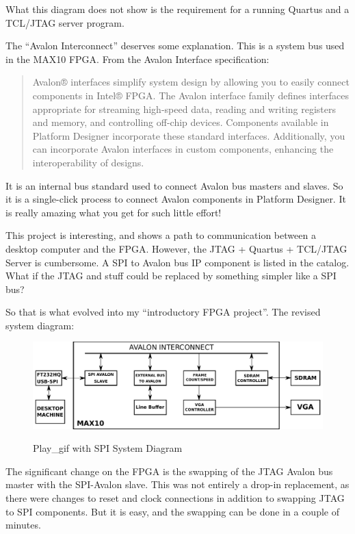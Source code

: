 What this diagram does not show is the requirement for a running Quartus and a TCL/JTAG server program.

The ``Avalon Interconnect'' deserves some explanation.  This is a system bus used in the MAX10 FPGA.  From the Avalon Interface specification:

\begin{quotation}
	Avalon® interfaces simplify system design by allowing you to easily connect
components in Intel® FPGA. The Avalon interface family defines interfaces appropriate
for streaming high-speed data, reading and writing registers and memory, and
controlling off-chip devices. Components available in Platform Designer incorporate
these standard interfaces. Additionally, you can incorporate Avalon interfaces in
custom components, enhancing the interoperability of designs.
\end{quotation}

It is an internal bus standard used to connect Avalon bus masters and slaves.  So it is a single-click process to connect Avalon components in Platform Designer.  It is really amazing what you get for such little effort!

This project is interesting, and shows a path to communication between a desktop computer and the FPGA.
However, the JTAG + Quartus + TCL/JTAG Server is cumbersome.  A SPI to Avalon bus IP component is listed in the catalog.
What if the JTAG and stuff could be replaced by something simpler like a SPI bus?

So that is what evolved into my ``introductory FPGA project''.  The revised system diagram:

\begin{figure}[h]
	\centering
	\includegraphics[width=1.0\textwidth]{images/spi_avalon_system}
	\centering\bfseries
	\caption{Play\_gif with SPI System Diagram}
\end{figure}

The significant change on the FPGA is the swapping of the JTAG Avalon bus master with the SPI-Avalon slave.  This was not entirely a drop-in replacement, as there were changes to reset and clock connections in addition to swapping JTAG to SPI components.  But it is easy, and the swapping can be done in a couple of minutes.

